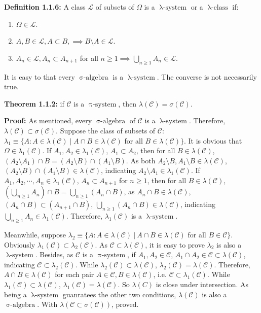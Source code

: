 \documentclass{article}
\newcommand{\mc}{\mathcal}
\DeclareMathOperator{\sialge}{\sigma-algebra}
\DeclareMathOperator{\pisys}{\pi-system}
\DeclareMathOperator{\lamsys}{\lambda-system}
\DeclareMathOperator{\lamcls}{\lambda-class}
\begin{document}
\vspace{2mm}
\textbf{Definition 1.1.6: } A class \(\mc{L}\) of subsets of \(\Omega\) is a \(\lamsys\) or a \(\lamcls\) if:

\begin{enumerate}[label=(\roman*)]
\item \(\Omega \in \mc{L}\).
\item \(A, B \in \mc{L}, A \subset B, \implies B\setminus A \in \mc{L} \).
\item \(A_n \in \mc{L}, A_{n} \subset A_{n+1}\) for all \(n \geq 1 \implies \bigcup_{n\geq 1}A_n \in \mc{L}\).
\end{enumerate}

It is easy to that every \(\sialge\) is a \(\lamsys\). The converse is not necessarily true.

\vspace{2mm}
\textbf{Theorem 1.1.2: }if \(\mc{C}\) is a \(\pisys\), then \(\lambda(\mc{C})=\sigma(\mc{C})\).

\vspace{2mm}
\textbf{Proof: } As mentioned, every \(\sialge\) of \(\mc{C}\) is a \(\lamsys\). Therefore, \(\lambda(\mc{C}) \subset 
\sigma(\mc{C})\). Suppose the class of subsets of \(\mc{C}\): \(\lambda_1 \equiv \{A: A\in \lambda(\mc{C})\; |\; A \cap B \in \lambda(\mc{C})
\) for all \(B\in \lambda(\mc{C})\}\). It is obvious that \(\Omega \in \lambda_1(\mc{C})\). If \(A_1, A_2\in \lambda_1(\mc{C})\),
\(A_1\subset A_2\), then for all \(B\in \lambda(\mc{C})\), \((A_2\setminus A_1)\cap B = (A_2\setminus B)\cap (A_1\setminus B)\).
As both \(A_2\setminus B, A_1\setminus B \in \lambda(\mc{C})\), \((A_2\setminus B)\cap (A_1\setminus B)\in \lambda(\mc{C})\),
indicating \(A_2\setminus A_1\in \lambda_1(\mc{C})\). If \(A_1, A_2, \cdots, A_n \in \lambda_1(\mc{C})\),
\(A_n\subset A_{n+1}\) for \(n\geq 1\), then for all \(B\in \lambda(\mc{C})\), \((\bigcup_{n\geq 1}A_n)\cap B=\bigcup_{n\geq 1}(A_n\cap B)\),
as \(A_n\cap B \in \lambda(\mc{C})\), \((A_n\cap B)\subset (A_{n+1}\cap B)\), \(\bigcup_{n\geq 1}(A_n\cap B)\in \lambda(\mc{C})\), indicating
\(\bigcup_{n\geq 1}A_n \in \lambda_1(\mc{C})\). Therefore, \(\lambda_1(\mc{C})\) is a \(\lamsys\).

Meanwhile, suppose \(\lambda_2 \equiv \{A: A\in \lambda(\mc{C})\: |\: A \cap B \in \lambda(\mc{C})\) for all \(B\in \mc{C}\}\).
Obviously \(\lambda_1(\mc{C})\subset \lambda_2(\mc{C})\).
As \(\mc{C}\subset \lambda(\mc{C})\), it is easy to prove \(\lambda_2\) is also a \(\lamsys\). Besides,
as \(\mc{C}\) is a \(\pisys\), if \(A_1, A_2 \in \mc{C}\), \(A_1\cap A_2 \in \mc{C}\subset \lambda(\mc{C})\), indicating
\(\mc{C}\subset \lambda_2(\mc{C})\). While \(\lambda_2(\mc{C})\subset \lambda(\mc{C})\), \(\lambda_2(\mc{C})=\lambda(\mc{C})\).
Therefore, \(A\cap B\in \lambda(\mc{C})\) for each pair \(A\in \mc{C}, B\in \lambda(\mc{C})\), i.e. \(\mc{C}\subset \lambda_1(\mc{C})\).
While \(\lambda_1(\mc{C})\subset \lambda(\mc{C})\), \(\lambda_1(\mc{C})=\lambda(\mc{C})\). So \(\lambda(C)\) is close under intersection.
As being a \(\lamsys\) guanratees the other two conditions, \(\lambda(\mc{C})\) is also a \(\sialge\). With \(\lambda(\mc{C}\subset
\sigma(\mc{C}))\), proved.
\end{document}
